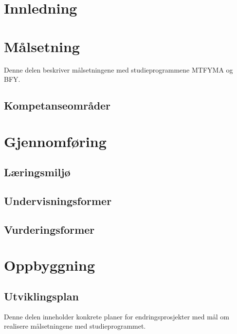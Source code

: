 \documentclass[a4paper, oneside, 12pt]{memoir}
\begin{document}
\part{Innledning}

\part{Målsetning}

Denne delen beskriver målsetningene med studieprogrammene MTFYMA og BFY.


\chapter{Kompetanseområder}


\part{Gjennomføring}

	\chapter{Læringsmiljø}
	
	\chapter{Undervisningsformer}
	
	\chapter{Vurderingsformer}

\part{Oppbyggning}

\appendix

\chapter{Utviklingsplan}

Denne delen inneholder konkrete planer for endringsprosjekter med mål om realisere målsetningene med studieprogrammet.
\end{document}

